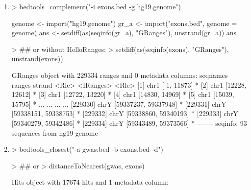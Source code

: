 \documentclass[10pt]{article}
\begin{document}
\begin{enumerate}
\item 
\begin{Schunk}
\begin{Sinput}
> bedtools_complement("-i exons.bed -g hg19.genome")
\end{Sinput}
\begin{Soutput}
{
    genome <- import("hg19.genome")
    gr_a <- import("exons.bed", genome = genome)
    ans <- setdiff(as(seqinfo(gr_a), "GRanges"), unstrand(gr_a))
    ans
}
\end{Soutput}
\begin{Sinput}
> ## or without HelloRanges:
> setdiff(as(seqinfo(exons), "GRanges"), unstrand(exons))
\end{Sinput}
\begin{Soutput}
GRanges object with 229334 ranges and 0 metadata columns:
           seqnames               ranges strand
              <Rle>            <IRanges>  <Rle>
       [1]     chr1       [    1, 11873]      *
       [2]     chr1       [12228, 12612]      *
       [3]     chr1       [12722, 13220]      *
       [4]     chr1       [14830, 14969]      *
       [5]     chr1       [15039, 15795]      *
       ...      ...                  ...    ...
  [229330]     chrY [59337237, 59337948]      *
  [229331]     chrY [59338151, 59338753]      *
  [229332]     chrY [59338860, 59340193]      *
  [229333]     chrY [59340279, 59342486]      *
  [229334]     chrY [59343489, 59373566]      *
  -------
  seqinfo: 93 sequences from hg19 genome
\end{Soutput}
\end{Schunk}
\item 
\begin{Schunk}
\begin{Sinput}
> bedtools_closest("-a gwas.bed -b exons.bed -d")
\end{Sinput}
\begin{Sinput}
> ## or 
> distanceToNearest(gwas, exons)
\end{Sinput}
\begin{Soutput}
Hits object with 17674 hits and 1 metadata column:

\end{Soutput}
\end{Schunk}
\end{enumerate}
\end{document}
